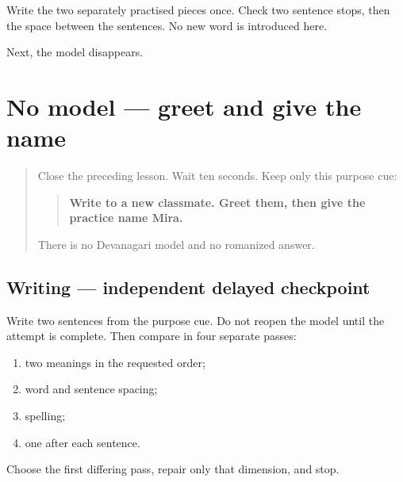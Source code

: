 Write the two separately practised pieces once. Check two sentence stops, then the space between the sentences. No new word is introduced here.

\begin{tcolorbox}[breakable,colback=teal!4,colframe=teal!35!black,title={Before you move on}]
Next, the model disappears.
\end{tcolorbox}
\section[\texorpdfstring{\hi{नमस्ते।} \hi{मेरा} \hi{नाम} … (namaste. merā …)}{नमस्ते। मेरा नाम … (namaste. merā …)}]{No model — greet and give the name}

\label{lesson:HI-W06-two-sentence-no-model}



\begin{quote}
Close the preceding lesson. Wait ten seconds. Keep only this purpose cue:

\begin{quote}
\textbf{Write to a new classmate. Greet them, then give the practice name Mira.}
\end{quote}

There is no Devanagari model and no romanized answer.
\end{quote}

\subsection*{Writing — independent delayed checkpoint}
Write two sentences from the purpose cue. Do not reopen the model until the attempt is complete. Then compare in four separate passes:

\begin{enumerate}
\raggedright
  \item two meanings in the requested order;
  \item word and sentence spacing;
  \item spelling;
  \item one \textbf{} after each sentence.
\end{enumerate}

Choose the first differing pass, repair only that dimension, and stop.

